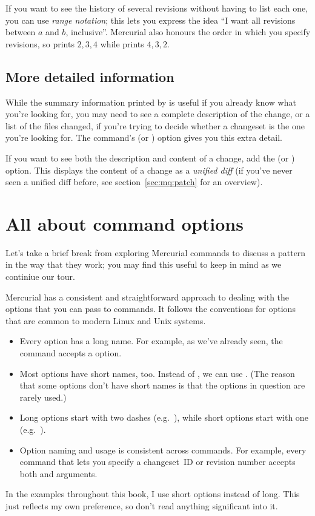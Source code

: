 If you want to see the history of several revisions without having to
list each one, you can use \emph{range notation}; this lets you
express the idea ``I want all revisions between $a$ and $b$,
inclusive''.
Mercurial also honours the order in which you specify revisions, so
 prints $2,3,4$ while 
prints $4,3,2$.

\subsection{More detailed information}

While the summary information printed by  is useful if you
already know what you're looking for, you may need to see a complete
description of the change, or a list of the files changed, if you're
trying to decide whether a changeset is the one you're looking for.
The  command's  (or )
option gives you this extra detail.

If you want to see both the description and content of a change, add
the  (or ) option.  This displays
the content of a change as a \emph{unified diff} (if you've never seen
a unified diff before, see section~\ref{sec:mq:patch} for an overview).

\section{All about command options}

Let's take a brief break from exploring Mercurial commands to discuss
a pattern in the way that they work; you may find this useful to keep
in mind as we continiue our tour.

Mercurial has a consistent and straightforward approach to dealing
with the options that you can pass to commands.  It follows the
conventions for options that are common to modern Linux and Unix
systems.
\begin{itemize}
\item Every option has a long name.  For example, as we've already
  seen, the  command accepts a  option.
\item Most options have short names, too.  Instead of
  , we can use .  (The reason that
  some options don't have short names is that the options in question
  are rarely used.)
\item Long options start with two dashes (e.g.~),
  while short options start with one (e.g.~).
\item Option naming and usage is consistent across commands.  For
  example, every command that lets you specify a changeset~ID or
  revision number accepts both  and 
  arguments.
\end{itemize}
In the examples throughout this book, I use short options instead of
long.  This just reflects my own preference, so don't read anything
significant into it.

